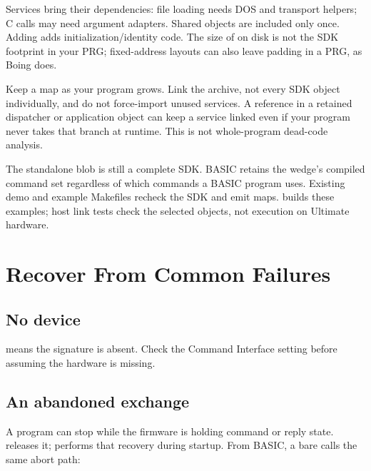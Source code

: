 Services bring their dependencies: file loading needs DOS and transport
helpers; C calls may need argument adapters. Shared objects are included only
once. Adding  adds initialization/identity code.
The size of  on disk is not the SDK footprint in your PRG;
fixed-address layouts can also leave padding in a PRG, as Boing does.

\begin{tip}
Keep a map as your program grows. Link the archive, not every SDK object
individually, and do not force-import unused services. A reference in a
retained dispatcher or application object can keep a service linked even if
your program never takes that branch at runtime. This is not whole-program
dead-code analysis.
\end{tip}

The standalone blob is still a complete SDK. BASIC retains the wedge's compiled
command set regardless of which commands a BASIC program uses. Existing demo
and example Makefiles recheck the SDK and emit maps.  builds these examples; host link tests check the selected
objects, not execution on Ultimate hardware.


\section{Recover From Common Failures}

\subsection*{No device}

 means the signature is absent. Check the
Command Interface setting before assuming the hardware is missing.

\subsection*{An abandoned exchange}

A program can stop while the firmware is holding command or reply state.
 releases it;  performs that recovery
during startup. From BASIC, a bare  calls the same abort path:

